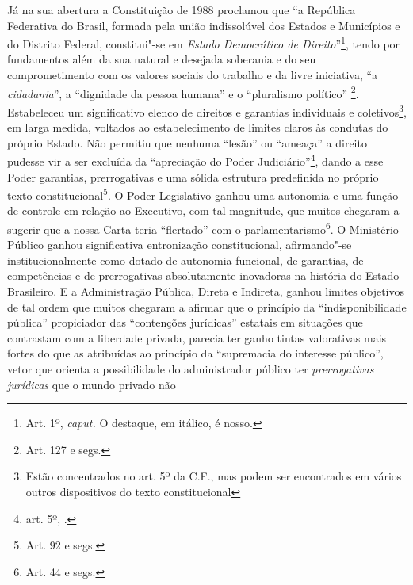 Já na sua abertura a Constituição de 1988 proclamou que ``a
República Federativa do Brasil, formada pela união indissolúvel dos
Estados e Municípios e do Distrito Federal, constitui"-se em
\emph{Estado Democrático de Direito}''\footnote{Art. 1º,
  \emph{caput.} O destaque, em itálico, é nosso.}, tendo por fundamentos
além da sua natural e desejada soberania e do seu comprometimento com os
valores sociais do trabalho e da livre iniciativa, ``a
\emph{cidadania}'', a ``dignidade da pessoa humana'' e o
``pluralismo político'' \footnote{Art. 127 e segs.}. Estabeleceu
um significativo elenco de direitos e garantias individuais e
coletivos\footnote{Estão concentrados no art. 5º da C.F., mas podem ser
  encontrados em vários outros dispositivos do texto constitucional}, em
larga medida, voltados ao estabelecimento de limites claros às condutas
do próprio Estado. Não permitiu que nenhuma ``lesão'' ou
``ameaça'' a direito pudesse vir a ser excluída da
``apreciação do Poder Judiciário''\footnote{art. 5º, .},
dando a esse Poder garantias, prerrogativas e uma sólida estrutura
predefinida no próprio texto constitucional\footnote{Art. 92 e segs.}. O
Poder Legislativo ganhou uma autonomia e uma função de controle em
relação ao Executivo, com tal magnitude, que muitos chegaram a sugerir
que a nossa Carta teria ``flertado'' com o parlamentarismo\footnote{Art.
  44 e segs.}. O Ministério Público ganhou significativa entronização
constitucional, afirmando"-se institucionalmente como dotado de autonomia
funcional, de garantias, de competências e de prerrogativas
absolutamente inovadoras na história do Estado Brasileiro. E a
Administração Pública, Direta e Indireta, ganhou limites objetivos de
tal ordem que muitos chegaram a afirmar que o princípio da
``indisponibilidade pública'' propiciador das ``contenções
jurídicas'' estatais em situações que contrastam com a liberdade
privada, parecia ter ganho tintas valorativas mais fortes do que as
atribuídas ao princípio da ``supremacia do interesse público'',
vetor que orienta a possibilidade do administrador público ter
\emph{prerrogativas jurídicas} que o mundo privado não

